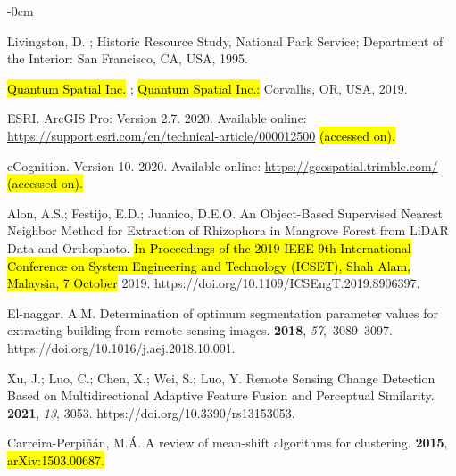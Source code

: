 \documentclass[remotesensing,article,accept,pdftex,moreauthors]{Definitions/mdpi}
\begin{document}
\begin{adjustwidth}{-\extralength}{0cm}
\begin{thebibliography}{999}
Livingston, D.
; Historic Resource Study, National Park Service;
  Department of the Interior: San Francisco, CA, USA, 1995.

\hl{Quantum Spatial Inc.} %
; \hl{Quantum Spatial Inc.:}
\newblock Corvallis, OR, USA, 2019.

ESRI.
\newblock ArcGIS Pro: Version 2.7. 2020. Available online: \url{https://support.esri.com/en/technical-article/000012500} \hl{(accessed on).} %


eCognition. Version 10. 2020. Available online: \url{https://geospatial.trimble.com/} \hl{(accessed on).}

Alon, A.S.; Festijo, E.D.; Juanico, D.E.O.
\newblock An Object-Based Supervised Nearest Neighbor Method for Extraction of
  Rhizophora in Mangrove Forest from LiDAR Data and Orthophoto. \hl{In Proceedings of the 2019 IEEE 9th International Conference on System Engineering and Technology (ICSET), Shah Alam, Malaysia, 7 October} 2019.
\newblock https://doi.org/10.1109/ICSEngT.2019.8906397.

El-naggar, A.M.
\newblock Determination of optimum segmentation parameter values for extracting
  building from remote sensing images.
 {\bf 2018}, {\em
  57},~3089--3097. https://doi.org/10.1016/j.aej.2018.10.001.

Xu, J.; Luo, C.; Chen, X.; Wei, S.; Luo, Y.
\newblock Remote Sensing Change Detection Based on Multidirectional Adaptive
  Feature Fusion and Perceptual Similarity.
 {\bf 2021}, {\em 13}, {3053.}
\newblock https://doi.org/10.3390/rs13153053.

Carreira{-}Perpi{\~{n}}{\'{a}}n, M.{\'{A}}.
\newblock A review of mean-shift algorithms for clustering.
 {\bf 2015}, \hl{arXiv:1503.00687.} %



\end{thebibliography}
\end{adjustwidth}
\end{document}
